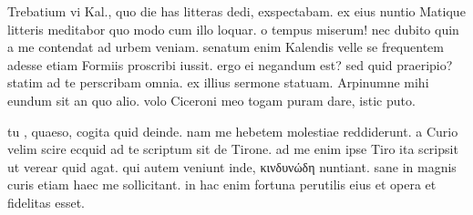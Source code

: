 


 Trebatium vi Kal., quo die has litteras dedi, exspectabam. ex eius nuntio Matique litteris meditabor quo modo cum illo loquar. o tempus miserum! nec dubito quin a me contendat ad urbem veniam. senatum enim Kalendis velle se frequentem adesse etiam Formiis proscribi iussit. ergo ei negandum est? sed quid praeripio? statim ad te perscribam omnia. ex illius sermone statuam. Arpinumne mihi eundum sit an quo alio. volo Ciceroni meo togam puram dare, istic puto.

 tu , quaeso, cogita quid deinde. nam me hebetem molestiae reddiderunt. a Curio velim scire ecquid ad te scriptum sit de Tirone. ad me enim ipse Tiro ita scripsit ut verear quid agat. qui autem veniunt inde, κινδυνώδη nuntiant. sane in magnis curis etiam haec me sollicitant. in hac enim fortuna perutilis eius et opera et fidelitas esset.
